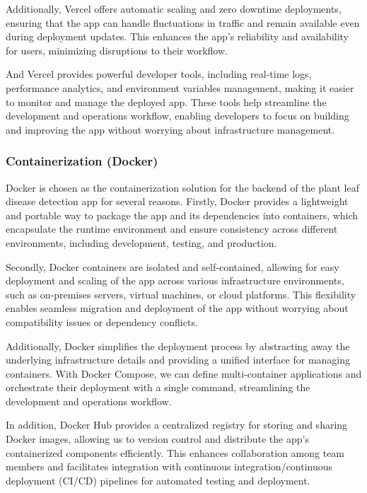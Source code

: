 \documentclass{article}
\begin{document}
Additionally, Vercel offers automatic scaling and zero downtime deployments, ensuring that the app can handle fluctuations in traffic and remain available even during deployment updates. This enhances the app's reliability and availability for users, minimizing disruptions to their workflow.

And Vercel provides powerful developer tools, including real-time logs, performance analytics, and environment variables management, making it easier to monitor and manage the deployed app. These tools help streamline the development and operations workflow, enabling developers to focus on building and improving the app without worrying about infrastructure management.


\subsubsection{Containerization (Docker)}

Docker is chosen as the containerization solution for the backend of the plant leaf disease detection app for several reasons. Firstly, Docker provides a lightweight and portable way to package the app and its dependencies into containers, which encapsulate the runtime environment and ensure consistency across different environments, including development, testing, and production.

Secondly, Docker containers are isolated and self-contained, allowing for easy deployment and scaling of the app across various infrastructure environments, such as on-premises servers, virtual machines, or cloud platforms. This flexibility enables seamless migration and deployment of the app without worrying about compatibility issues or dependency conflicts.

Additionally, Docker simplifies the deployment process by abstracting away the underlying infrastructure details and providing a unified interface for managing containers. With Docker Compose, we can define multi-container applications and orchestrate their deployment with a single command, streamlining the development and operations workflow.

In addition, Docker Hub provides a centralized registry for storing and sharing Docker images, allowing us to version control and distribute the app's containerized components efficiently. This enhances collaboration among team members and facilitates integration with continuous integration/continuous deployment (CI/CD) pipelines for automated testing and deployment.
\end{document}
